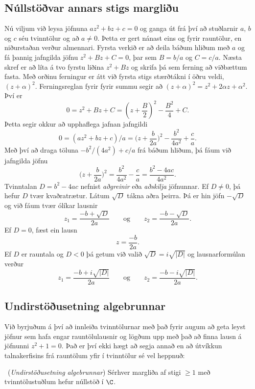 \subsection*{Núllstöðvar annars stigs margliðu}

Nú viljum við leysa jöfnuna  $az^2+bz+c=0$ og ganga út frá því 
að  stuðlarnir $a$, $b$ og $c$ séu tvinntölur og að $a\neq 0$.
Þetta er gert nánast eins og fyrir rauntölur, en niðurstaðan verður
almennari. 
Fyrsta verkið er að deila báðum hliðum með $a$ og fá þannig jafngilda
jöfnu  $z^2+Bz+C=0$, þar sem $B=b/a$ og $C=c/a$.  Næsta skref er að
líta á tvo fyrstu liðina $z^2+Bz$ og skrifa þá sem ferning að viðbættum
fasta.  Með orðinu ferningur er átt við fyrsta stigs stærðtákni
í öðru veldi, $(z+\alpha)^2$.  Ferningsreglan fyrir fyrir summu segir
að $(z+\alpha)^2=z^2+2\alpha z+\alpha^2$.  Því er 
$$
0=z^2+Bz+C=(z+\dfrac B2)^2-\dfrac {B^2}4+C.
$$
Þetta segir okkur að upphaflega jafnan jafngildi
$$
0=(az^2+bz+c)/a=\bigg(z+\dfrac {b}{2a}\bigg)^2-\dfrac{b^2}{4a^2}+\dfrac ca.
$$
Með því að draga töluna $-b^2/(4a^2)+c/a$ frá báðum hliðum, þá fáum við
jafngilda jöfnu
$$
\bigg(z+\dfrac {b}{2a}\bigg)^2=\dfrac{b^2}{4a^2}-\dfrac ca=\dfrac{b^2-4ac}{4a^2}.
$$
Tvinntalan  $D=b^2-4ac$ nefnist {\it aðgreinir} eða {\it aðskilja }
jöfnunnar. Ef $D\neq 0$, þá hefur $D$ tvær kvaðratrætur.  
Látum $\sqrt D$ tákna aðra þeirra.  Þá er hin jöfn
$-\sqrt D$ og við fáum tvær ólíkar lausnir 
$$
z_1=\dfrac{-b+\sqrt D}{2a} \qquad\text {og} \qquad
z_2=\dfrac{-b-\sqrt D}{2a}.
$$
Ef $D=0$, fæst ein lausn
$$
z=\dfrac{-b}{2a}.
$$
Ef $D$ er rauntala og $D<0$ þá getum við valið $\sqrt D=i\sqrt{|D|}$
og lausnarformúlan verður
$$
z_1=\dfrac{-b+i\sqrt{ |D|}}{2a} \qquad\text {og} \qquad
z_2=\dfrac{-b-i\sqrt{|D|}}{2a}.
$$

\subsection*{Undirstöðusetning algebrunnar}

Við byrjuðum á því að innleiða tvinntölurnar með það fyrir augum að
geta leyst jöfnur sem hafa engar rauntölulausnir og lögðum upp með það
að finna lausn á jöfnunni $z^2+1=0$.  Það er því ekki hægt að
segja annað en að útvíkkun talnakerfisins frá rauntölum yfir í
tvinntölur sé vel heppnuð:
 
\begin{se} \  ({\it Undirstöðusetning
algebrunnar})   Sérhver margliða af stigi $\geq 1$
með tvinntölustuðlum hefur  núllstöð í $\C$.  
\end{se}

